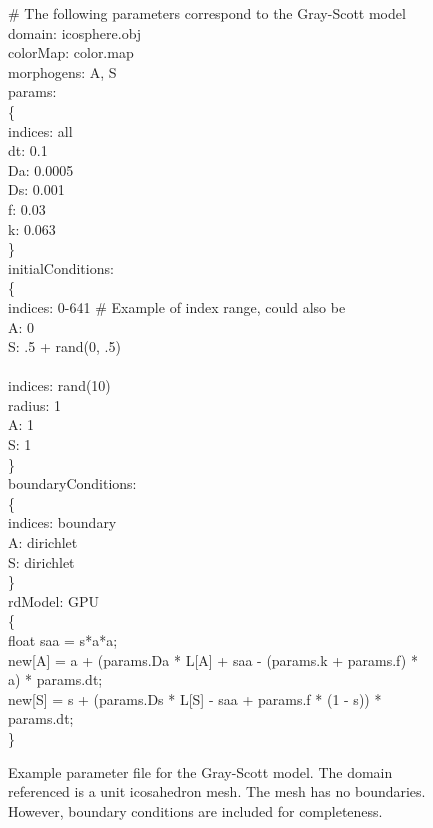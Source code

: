 \begin{figure}[p]
\LinesNotNumbered
\begin{algorithm}[H]
	\# The following parameters correspond to the Gray-Scott model \\	
	domain: icosphere.obj \\
	colorMap: color.map \\
	morphogens: A, S\\
	
	params:\\
	\{\\
\quad indices: all\\
\quad dt: 0.1\\
\quad Da: 0.0005\\
\quad Ds: 0.001\\
\quad f: 0.03\\
\quad k: 0.063\\
	\}\\
	initialConditions:\\
	\{\\
\quad indices: 0-641 \# Example of index range, could also be \\
\quad A: 0\\
\quad S: .5 + rand(0, .5)\\
\quad \\
\quad indices: rand(10)\\
\quad radius: 1\\
\quad A: 1\\
\quad S: 1\\
	\}\\
	boundaryConditions:\\
	\{\\
\quad indices: boundary \\
\quad A: dirichlet\\
\quad S: dirichlet\\
	\}\\
	rdModel: GPU\\
	\{\\
\quad float saa = s*a*a;\\
\quad new[A] = a + (params.Da * L[A] + saa - (params.k + params.f) * a) * params.dt;\\
\quad new[S] = s + (params.Ds * L[S] - saa + params.f * (1 - s)) * params.dt;\\
	\}
\end{algorithm}
	\caption[Example parameter file for the Gray-Scott model]{Example parameter file for the Gray-Scott model. The domain referenced is a unit icosahedron mesh. The mesh has no boundaries. However, boundary conditions are included for completeness.}
	\label{fig:paramFileExample}
\end{figure}

